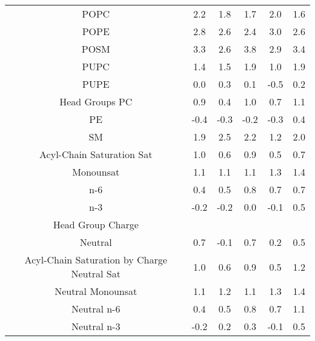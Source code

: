 \documentclass[9pt]{article}
\begin{document}
\begin{table}
{\begin{tabular}{| c || ccccc |}
POPC    &2.2&1.8&1.7&2.0&1.6\\
POPE    &2.8&2.6&2.4&3.0&2.6\\
POSM    &3.3&2.6&3.8&2.9&3.4\\
PUPC    &1.4&1.5&1.9&1.0&1.9\\
PUPE    &0.0&0.3&0.1&-0.5&0.2\\
\hline
Head Groups 
PC      &0.9&0.4&1.0&0.7&1.1\\
PE      &-0.4&-0.3&-0.2&-0.3&0.4\\
SM      &1.9&2.5&2.2&1.2&2.0\\
\hline
Acyl-Chain Saturation 
Sat      &1.0&0.6&0.9&0.5&0.7\\
Monounsat      &1.1&1.1&1.1&1.3&1.4\\
n-6&0.4&0.5&0.8&0.7&0.7\\
n-3&-0.2&-0.2&0.0&-0.1&0.5\\
\hline
Head Group Charge&&&&&\\
Neutral &0.7&-0.1&0.7&0.2&0.5\\
\hline
Acyl-Chain Saturation by Charge 
Neutral Sat    &1.0&0.6&0.9&0.5&1.2\\
Neutral Monounsat    &1.1&1.2&1.1&1.3&1.4\\
Neutral n-6&0.4&0.5&0.8&0.7&1.1\\
Neutral n-3&-0.2&0.2&0.3&-0.1&0.5\\
\hline
\end{tabular}}
\end{table}
\end{document}
